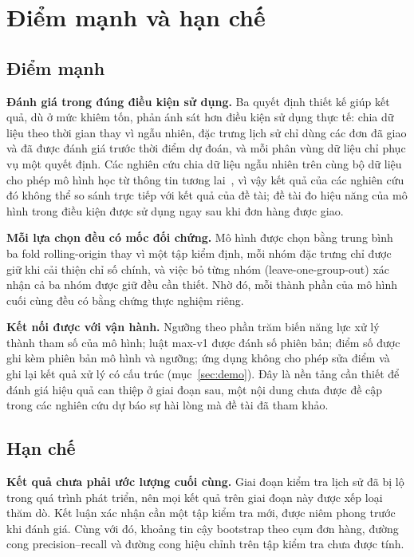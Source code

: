 \section{Điểm mạnh và hạn chế}\label{sec:disc-sw}

\subsection{Điểm mạnh}

\textbf{Đánh giá trong đúng điều kiện sử dụng.} Ba quyết định thiết kế giúp kết quả, dù ở mức khiêm tốn, phản ánh sát hơn điều kiện sử dụng thực tế: chia dữ liệu theo thời gian thay vì ngẫu nhiên, đặc trưng lịch sử chỉ dùng các đơn đã giao và đã được đánh giá trước thời điểm dự đoán, và mỗi phân vùng dữ liệu chỉ phục vụ một quyết định. Các nghiên cứu chia dữ liệu ngẫu nhiên trên cùng bộ dữ liệu cho phép mô hình học từ thông tin tương lai~\cite{orman2026}, vì vậy kết quả của các nghiên cứu đó không thể so sánh trực tiếp với kết quả của đề tài; đề tài đo hiệu năng của mô hình trong điều kiện được sử dụng ngay sau khi đơn hàng được giao.

\textbf{Mỗi lựa chọn đều có mốc đối chứng.} Mô hình được chọn bằng trung bình ba fold rolling-origin thay vì một tập kiểm định, mỗi nhóm đặc trưng chỉ được giữ khi cải thiện chỉ số chính, và việc bỏ từng nhóm (leave-one-group-out) xác nhận cả ba nhóm được giữ đều cần thiết. Nhờ đó, mỗi thành phần của mô hình cuối cùng đều có bằng chứng thực nghiệm riêng.

\textbf{Kết nối được với vận hành.} Ngưỡng theo phần trăm biến năng lực xử lý thành tham số của mô hình; luật max-v1 được đánh số phiên bản; điểm số được ghi kèm phiên bản mô hình và ngưỡng; ứng dụng không cho phép sửa điểm và ghi lại kết quả xử lý có cấu trúc (mục~\ref{sec:demo}). Đây là nền tảng cần thiết để đánh giá hiệu quả can thiệp ở giai đoạn sau, một nội dung chưa được đề cập trong các nghiên cứu dự báo sự hài lòng mà đề tài đã tham khảo.

\subsection{Hạn chế}

\textbf{Kết quả chưa phải ước lượng cuối cùng.} Giai đoạn kiểm tra lịch sử đã bị lộ trong quá trình phát triển, nên mọi kết quả trên giai đoạn này được xếp loại thăm dò. Kết luận xác nhận cần một tập kiểm tra mới, được niêm phong trước khi đánh giá. Cùng với đó, khoảng tin cậy bootstrap theo cụm đơn hàng, đường cong precision--recall và đường cong hiệu chỉnh trên tập kiểm tra chưa được tính.

